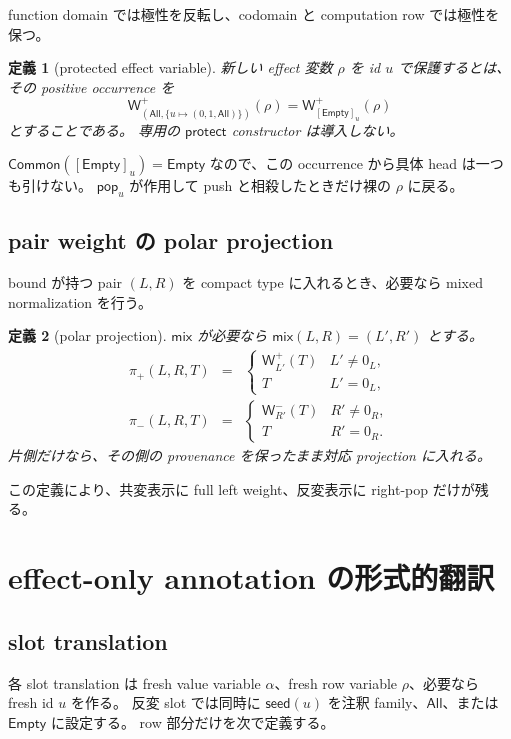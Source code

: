\documentclass[uplatex,dvipdfmx,a4paper,10.5pt]{jsarticle}
\theoremstyle{jpplain}
\newtheorem{definition}{定義}[section]
\newcommand{\All}{\mathsf{All}}
\newcommand{\Empty}{\mathsf{Empty}}
\newcommand{\Common}{\mathsf{Common}}
\newcommand{\mix}{\mathsf{mix}}
\newcommand{\projp}{\pi_{+}}
\newcommand{\projn}{\pi_{-}}
\newcommand{\PWeight}[2]{\mathsf{W}^{+}_{#1}(#2)}
\newcommand{\NWeight}[2]{\mathsf{W}^{-}_{#1}(#2)}
\newcommand{\takeop}[2]{[#1]_{#2}}
\newcommand{\popop}[1]{\mathsf{pop}_{#1}}
\newcommand{\seedcap}{\mathsf{seed}}
\begin{document}
function domain では極性を反転し、codomain と computation row では極性を保つ。

\begin{definition}[protected effect variable]
新しい effect 変数 $\rho$ を id $u$ で保護するとは、その positive occurrence を
\[
  \PWeight{(\All,\{u\mapsto(0,1,\All)\})}{\rho}
  =\PWeight{\takeop{\Empty}{u}}{\rho}
\]
とすることである。
専用の $\mathsf{protect}$ constructor は導入しない。
\end{definition}

$\Common(\takeop{\Empty}{u})=\Empty$ なので、この occurrence から具体 head は一つも引けない。
$\popop{u}$ が作用して push と相殺したときだけ裸の $\rho$ に戻る。

\subsection{pair weight の polar projection}

bound が持つ pair $(L,R)$ を compact type に入れるとき、必要なら mixed normalization を行う。

\begin{definition}[polar projection]
$\mix$ が必要なら $\mix(L,R)=(L',R')$ とする。
\[
\begin{array}{rcl}
\projp(L,R,T)&=&\begin{cases}
\PWeight{L'}{T}&L'\neq0_L,\\T&L'=0_L,
\end{cases}\\[1ex]
\projn(L,R,T)&=&\begin{cases}
\NWeight{R'}{T}&R'\neq0_R,\\T&R'=0_R.
\end{cases}
\end{array}
\]
片側だけなら、その側の provenance を保ったまま対応 projection に入れる。
\end{definition}

この定義により、共変表示に full left weight、反変表示に right-pop だけが残る。

\section{effect-only annotation の形式的翻訳}

\subsection{slot translation}

各 slot translation は fresh value variable $\alpha$、fresh row variable $\rho$、必要なら fresh id $u$ を作る。
反変 slot では同時に $\seedcap(u)$ を注釈 family、$\All$、または $\Empty$ に設定する。
row 部分だけを次で定義する。
\end{document}
